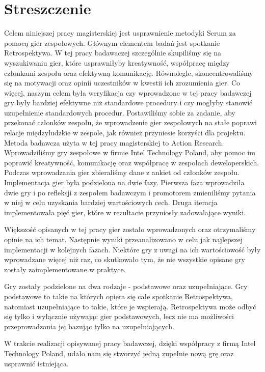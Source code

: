 \chapter*{Streszczenie}

\tab Celem niniejszej pracy magisterskiej jest usprawnienie metodyki Scrum za pomocą gier zespołowych. Głównym elementem badań jest spotkanie Retrospektywa. W tej pracy badawaczej szczególnie skupiliśmy się na wyszukiwaniu gier, które usprawniłyby kreatywność, współpracę między członkami zespołu oraz efektywną komunikację. Równolegle, skoncentrowaliśmy się na motywacji oraz opinii uczestników w kwestii ich zrozumienia gier. Co więcej, naszym celem była weryfikacja czy wprowadzone w tej pracy badawczej gry były bardziej efektywne niż standardowe procedury i czy mogłyby stanowić uzupełnienie standardowych procedur. Postawiliśmy sobie za zadanie, aby przekonać członków zespołu, że wprowadzenie gier zespołowych na stałe poprawi relacje międzyludzkie w zespole, jak również przyniesie korzyści dla projektu. Metoda badawcza użyta w tej pracy magisterskiej to Action Research. Wprowadziliśmy gry zespołowe w firmie Intel Technology Poland, aby pomoc im poprawić kreatywność, komunikację oraz współpracę w zespołach deweloperskich. Podczas wprowadzania gier zbieraliśmy dane z ankiet od członków zespołu. Implementacja gier była podzielona na dwie fazy. Pierwsza faza wprowadziła dwie gry i po refleksji z zespołem badawczym i promotorem zmieniliśmy pytania w niej w celu uzyskania bardziej wartościowych cech. Druga iteracja implementowała pięć gier, które w rezultacie przyniosły zadowalające wyniki.

\tab Większość opisanych w tej pracy gier zostało wprowadzonych oraz otrzymaliśmy opinie na ich temat. Następnie wyniki przeanalizowano w celu jak najlepszej implementacji w kolejnych fazach. Niektóre gry z uwagi na ich wartościowość były wprowadzane więcej niż raz, co skutkowało tym, że nie wszystkie opisane gry zostały zaimplementowane w praktyce.

\tab Gry zostały podzielone na dwa rodzaje - podstawowe oraz uzupełniające. Gry podstawowe to takie na których opiera się całe spotkanie Retrospektywa, natomiast uzupełniające to takie, które je wspierają. Retrospektywa może odbyć się tylko i wyłącznie używając gier podstawowych, lecz nie ma możliwości przeprowadzania jej bazując tylko na uzupełniających.

\tab W trakcie realizacji opisywanej pracy badawczej, dzięki współpracy z firmą Intel Technology Poland, udało nam się stworzyć jedną zupełnie nową grę oraz usprawnić istniejąca.

